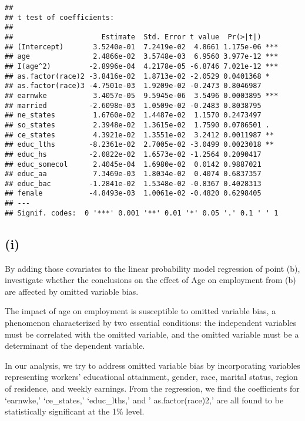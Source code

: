 \documentclass[
]{article}
\begin{document}
\begin{verbatim}
## 
## t test of coefficients:
## 
##                     Estimate  Std. Error t value  Pr(>|t|)    
## (Intercept)       3.5240e-01  7.2419e-02  4.8661 1.175e-06 ***
## age               2.4866e-02  3.5748e-03  6.9560 3.977e-12 ***
## I(age^2)         -2.8996e-04  4.2178e-05 -6.8746 7.021e-12 ***
## as.factor(race)2 -3.8416e-02  1.8713e-02 -2.0529 0.0401368 *  
## as.factor(race)3 -4.7501e-03  1.9209e-02 -0.2473 0.8046987    
## earnwke           3.4057e-05  9.5945e-06  3.5496 0.0003895 ***
## married          -2.6098e-03  1.0509e-02 -0.2483 0.8038795    
## ne_states         1.6760e-02  1.4487e-02  1.1570 0.2473497    
## so_states         2.3948e-02  1.3615e-02  1.7590 0.0786501 .  
## ce_states         4.3921e-02  1.3551e-02  3.2412 0.0011987 ** 
## educ_lths        -8.2361e-02  2.7005e-02 -3.0499 0.0023018 ** 
## educ_hs          -2.0822e-02  1.6573e-02 -1.2564 0.2090417    
## educ_somecol      2.4045e-04  1.6980e-02  0.0142 0.9887021    
## educ_aa           7.3469e-03  1.8034e-02  0.4074 0.6837357    
## educ_bac         -1.2841e-02  1.5348e-02 -0.8367 0.4028313    
## female           -4.8493e-03  1.0061e-02 -0.4820 0.6298405    
## ---
## Signif. codes:  0 '***' 0.001 '**' 0.01 '*' 0.05 '.' 0.1 ' ' 1
\end{verbatim}

\hypertarget{i-3}{%
\subsection{(i)}\label{i-3}}

By adding those covariates to the linear probability model regression of
point (b), investigate whether the conclusions on the effect of Age on
employment from (b) are affected by omitted variable bias. \vspace{1em}

The impact of age on employment is susceptible to omitted variable bias,
a phenomenon characterized by two essential conditions: the independent
variables must be correlated with the omitted variable, and the omitted
variable must be a determinant of the dependent variable.

In our analysis, we try to address omitted variable bias by
incorporating variables representing workers' educational attainment,
gender, race, marital status, region of residence, and weekly earnings.
From the regression, we find the coefficients for `earnwke,'
`ce\_states,' `educ\_lths,' and ' as.factor(race)2,' are all found to be
statistically significant at the 1\% level.
\end{document}
